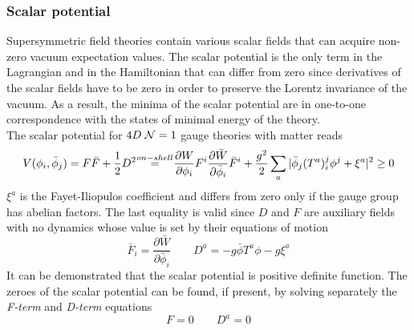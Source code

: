 \begin{appendices}
 \subsubsection{Scalar potential}
Supersymmetric field theories contain various scalar fields that can acquire non-zero vacuum expectation values.
The scalar potential is the only term in the Lagrangian and in the Hamiltonian that can differ from zero since derivatives of the scalar fields have to be zero in order to preserve the Lorentz invariance of the vacuum.
As a result, the minima of the scalar potential are in one-to-one correspondence with the states of minimal energy of the theory.\\
The scalar potential for $4D \; \mathcal{N}=1$ gauge theories with matter reads
\begin{equation}
 V ( \phi_i, \bar{\phi}_j) = F \bar{F} + \frac{1}{2} D^2  \quad \overset{\mathclap{on-shell}}=   \quad \frac{\partial W}{\partial \phi_i} F^i \frac{\partial \bar{W}} {\partial \bar{\phi}_i} \bar{F}^i + \frac{g^2}{2} \sum_a | \bar{\phi}_j (T^a)^j_i \phi^j + \xi^a | ^2  \geq 0
\end{equation} 
$\xi^a$ is the Fayet-Iliopulos coefficient and differs from zero only if the gauge group has abelian factors.
The last equality is valid since $D$ and $F$ are auxiliary fields with no dynamics whose value is set by their equations of motion
\begin{equation}
 \bar{F}_i  = \frac{\partial \bar{W}} {\partial \bar{\phi}_i} \qquad D^a = - g \bar{\phi} T^a \phi - g \xi^a 
\end{equation}
It can be demonstrated that the scalar potential is positive definite function.
The zeroes of the scalar potential can be found, if present, by solving separately the \emph{F-term} and \emph{D-term} equations
\begin{equation}
F = 0 \qquad D^a = 0
\label{eqn:F_D_term}
\end{equation}

































\end{appendices}
